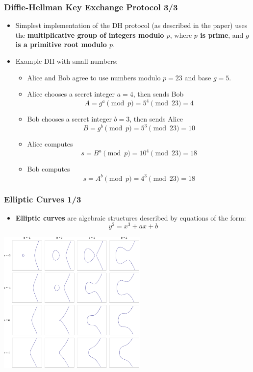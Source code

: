 \documentclass{beamer}
\begin{document}
\begin{frame}
  \frametitle{Diffie-Hellman Key Exchange Protocol 3/3}
  \begin{itemize}
  \item Simplest implementation of the DH protocol (as described in the paper)
    uses the \textbf{multiplicative group of integers modulo $p$}, where
    \textbf{$p$ is prime}, and\textbf{ $g$ is a primitive root modulo $p$}.
  \item Example DH with small numbers:
    \begin{itemize}
      \scriptsize
    \item Alice and Bob agree to use numbers modulo $p = 23$ and base $g = 5$.
    \item Alice chooses a secret integer $a = 4$, then sends Bob
        $$A = g^a \pmod{p} = 5^4 \pmod{23} = 4$$
    \item Bob chooses a secret integer $b = 3$, then sends Alice
      $$B = g^b \pmod{p} = 5^3 \pmod{23} = 10$$
    \item Alice computes
      $$s = B^a \pmod{p} = 10^4 \pmod{23} = 18$$
    \item Bob computes
      $$s = A^b \pmod{p} = 4^3 \pmod{23} = 18$$
    \end{itemize}
  \end{itemize}
\end{frame}

\begin{frame}
  \frametitle{Elliptic Curves 1/3}
  \begin{itemize}
  \item \textbf{Elliptic curves} are algebraic structures described by equations
    of the form:
    $$y^2 = x^3 + ax + b$$
  \end{itemize}
  \begin{center}
    \includegraphics[width=0.55\textwidth]{ec}
  \end{center}
\end{frame}
\end{document}
